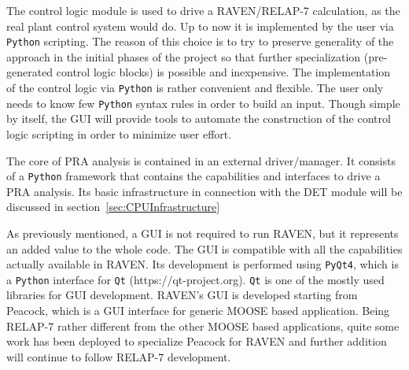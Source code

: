 The control logic module is used to drive a RAVEN/RELAP-7 calculation, as the real plant control system would do. Up to now it is implemented by the user via \verb!Python! scripting. The reason of this choice is to try to preserve generality of the approach in the initial phases of the project so that further specialization (pre-generated control logic blocks)  is possible and  inexpensive. The implementation of the control logic via \verb!Python! is rather convenient and flexible. The user only needs to know few \verb!Python! syntax rules in order to build an input. Though simple by itself, the GUI will provide tools to automate the construction of the control logic scripting in order to minimize user effort. 

The core of PRA analysis is contained in an external driver/manager. It consists of a \verb!Python! framework that contains the capabilities and interfaces to drive a PRA analysis. Its basic infrastructure in connection with the DET module will be discussed in section~\ref{sec:CPUInfrastructure}   

As previously mentioned, a GUI is not required to run RAVEN, but it represents an added value to the whole code. The GUI is compatible with all the capabilities actually available in RAVEN.  Its development is performed using \verb!PyQt4!, which is a \verb!Python! interface for \verb!Qt! (https://qt-project.org). \verb!Qt!  is one of the mostly used libraries for GUI development. RAVEN’s GUI is developed starting from Peacock, which is a GUI interface for generic MOOSE based application. Being RELAP-7 rather different from the other MOOSE based applications, quite some work has been deployed to specialize Peacock for RAVEN and further addition will continue to follow RELAP-7 development. 
\vspace{-5mm}
